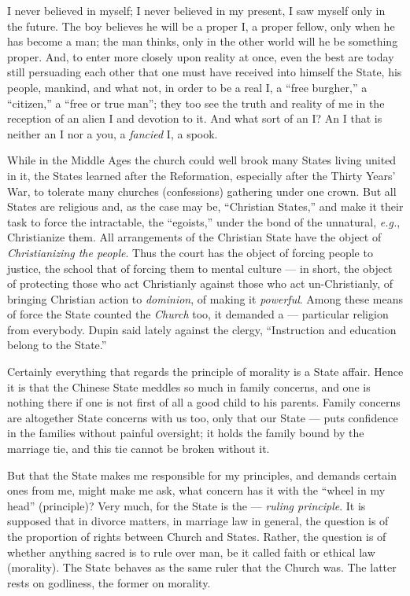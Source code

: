 I never believed in myself; I never believed in my present, I saw myself only 
in the future. The boy believes he will be a proper I, a proper fellow, only 
when he has become a man; the man thinks, only in the other world will he be 
something proper. And, to enter more closely upon reality at once, even the 
best are today still persuading each other that one must have received into 
himself the State, his people, mankind, and what not, in order to be a real I, 
a ``free burgher,'' a ``citizen,'' a ``free or true man''; they too see 
the truth and reality of me in the reception of an alien I and devotion to it. 
And what sort of an I? An I that is neither an I nor a you, a \textit{fancied} 
I, a spook.

While in the Middle Ages the church could well brook many States living united 
in it, the States learned after the Reformation, especially after the Thirty 
Years' War, to tolerate many churches (confessions) gathering under one crown. 
But all States are religious and, as the case may be, ``Christian States,'' 
and make it their task to force the intractable, the ``egoists,'' under the 
bond of the unnatural, \textit{e.g.}, Christianize them. All arrangements of 
the Christian State have the object of \textit{Christianizing the people}. 
Thus the court has the object of forcing people to justice, the school that of 
forcing them to mental culture --- in short, the object of protecting those who 
act Christianly against those who act un-Christianly, of bringing Christian 
action to \textit{dominion}, of making it \textit{powerful}. Among these means 
of force the State counted the \textit{Church} too, it demanded a --- particular religion from everybody. Dupin said lately against the clergy, 
``Instruction and education belong to the State.''

Certainly everything that regards the principle of morality is a State affair. 
Hence it is that the Chinese State meddles so much in family concerns, and one 
is nothing there if one is not first of all a good child to his parents. 
Family concerns are altogether State concerns with us too, only that our State --- puts confidence in the families without painful oversight; it holds the 
family bound by the marriage tie, and this tie cannot be broken without it.

But that the State makes me responsible for my principles, and demands certain 
ones from me, might make me ask, what concern has it with the ``wheel in my 
head'' (principle)? Very much, for the State is the --- \textit{ruling 
principle}. It is supposed that in divorce matters, in marriage law in 
general, the question is of the proportion of rights between Church and 
States. Rather, the question is of whether anything sacred is to rule over 
man, be it called faith or ethical law (morality). The State behaves as the 
same ruler that the Church was. The latter rests on godliness, the former on 
morality.

